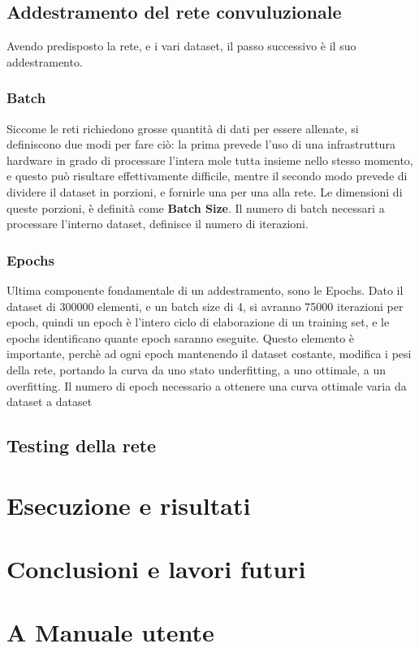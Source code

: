 \documentclass[14pt]{extarticle}
\begin{document}
\subsection{Addestramento del rete convuluzionale}
Avendo predisposto la rete, e i vari dataset, il passo successivo è il suo addestramento.

\subsubsection{Batch}
Siccome le reti richiedono grosse quantità di dati per essere allenate, si definiscono due modi per fare ciò: la prima prevede l'uso di una infrastruttura hardware in grado di processare l'intera mole tutta insieme nello stesso momento, e questo può risultare effettivamente difficile, mentre il secondo modo prevede di dividere il dataset in porzioni, e fornirle una per una alla rete.
Le dimensioni di queste porzioni, è definità come \textbf{Batch Size}.
Il numero di batch  necessari a processare l'interno dataset, definisce il numero di iterazioni.

\subsubsection{Epochs}
Ultima componente fondamentale di un addestramento, sono le Epochs.
Dato il dataset di 300000 elementi, e un batch size di 4, si avranno 75000 iterazioni per epoch, quindi un epoch è l'intero ciclo di elaborazione di un training set, e le epochs identificano quante epoch saranno eseguite. Questo elemento è importante, perchè ad ogni epoch mantenendo il dataset costante, modifica i pesi della rete, portando la curva da uno stato underfitting, a uno ottimale, a un overfitting. 
Il numero di epoch necessario a ottenere una curva ottimale varia da dataset a dataset
\subsection{Testing della rete}

\section{Esecuzione e risultati}

\section{Conclusioni e lavori futuri}

\section{A Manuale utente}

\newpage
\printbibliography
\end{document}
